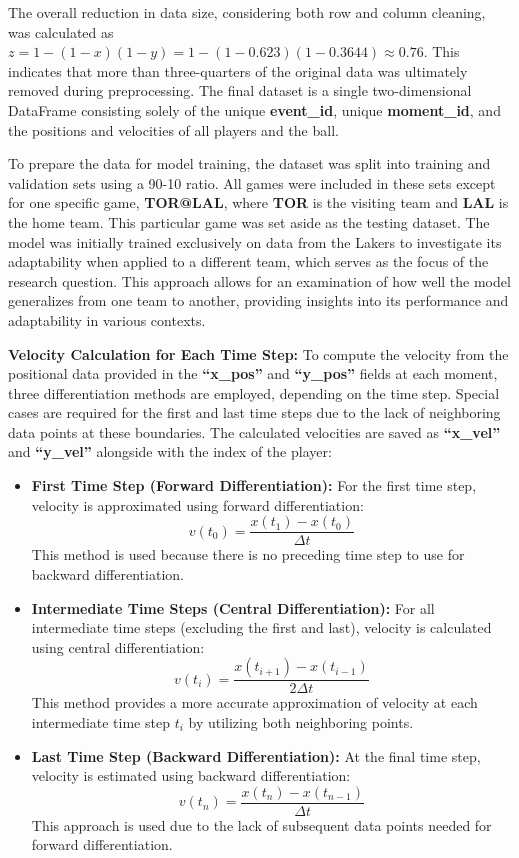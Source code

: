 The overall reduction in data size, considering both row and column cleaning, was calculated as \(z = 1 - (1 - x)(1 - y) = 1 - (1 - 0.623)(1 - 0.3644) \approx 0.76\). This indicates that more than three-quarters of the original data was ultimately removed during preprocessing. The final dataset is a single two-dimensional DataFrame consisting solely of the unique \textbf{event\_id}, unique \textbf{moment\_id}, and the positions and velocities of all players and the ball.

To prepare the data for model training, the dataset was split into training and validation sets using a 90-10 ratio. All games were included in these sets except for one specific game, \textbf{TOR@LAL}, where \textbf{TOR} is the visiting team and \textbf{LAL} is the home team. This particular game was set aside as the testing dataset. The model was initially trained exclusively on data from the Lakers to investigate its adaptability when applied to a different team, which serves as the focus of the research question. This approach allows for an examination of how well the model generalizes from one team to another, providing insights into its performance and adaptability in various contexts.


\textbf{Velocity Calculation for Each Time Step:}  
To compute the velocity from the positional data provided in the \textbf{``x\_pos''} and \textbf{``y\_pos''} fields at each moment, three differentiation methods are employed, depending on the time step. Special cases are required for the first and last time steps due to the lack of neighboring data points at these boundaries. The calculated velocities are saved as \textbf{``x\_vel''} and \textbf{``y\_vel''} alongside with the index of the player:

\begin{itemize}
    \item \textbf{First Time Step (Forward Differentiation):} For the first time step, velocity is approximated using forward differentiation:
    \[
    v(t_0) = \frac{x(t_1) - x(t_0)}{\Delta t}
    \]
    This method is used because there is no preceding time step to use for backward differentiation.

    \item \textbf{Intermediate Time Steps (Central Differentiation):} For all intermediate time steps (excluding the first and last), velocity is calculated using central differentiation:
    \[
    v(t_i) = \frac{x(t_{i+1}) - x(t_{i-1})}{2 \Delta t}
    \]
    This method provides a more accurate approximation of velocity at each intermediate time step \( t_i \) by utilizing both neighboring points.

    \item \textbf{Last Time Step (Backward Differentiation):} At the final time step, velocity is estimated using backward differentiation:
    \[
    v(t_n) = \frac{x(t_n) - x(t_{n-1})}{\Delta t}
    \]
    This approach is used due to the lack of subsequent data points needed for forward differentiation.
\end{itemize}


